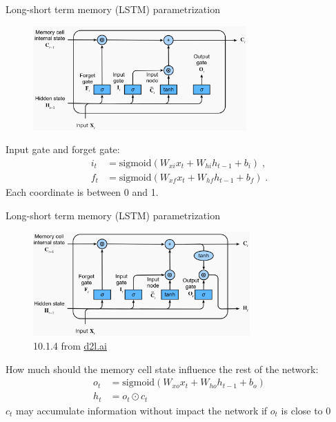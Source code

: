 \documentclass[usenames,dvipsnames,notes,11pt,aspectratio=169,hyperref={colorlinks=true, linkcolor=blue}]{beamer}
\begin{document}
\begin{frame}
    {Long-short term memory (LSTM) parametrization}
    \begin{figure}
        \includegraphics[height=4cm]{figures/lstm-2}
    \end{figure}

    Input gate and forget gate:
            \begin{align*}
 i_t &= \text{sigmoid}(W_{xi}x_t + W_{hi}h_{t-1} + b_i) \;,\\
 f_t &= \text{sigmoid}(W_{xf}x_t + W_{hf}h_{t-1} + b_f) \;.
            \end{align*}
    Each coordinate is between 0 and 1.
\end{frame}

\begin{frame}
    {Long-short term memory (LSTM) parametrization}
    \begin{figure}
        \includegraphics[height=4cm]{figures/lstm-3}
        \caption{10.1.4 from \href{https://d2l.ai/chapter_recurrent-modern/lstm.html}{d2l.ai}}
    \end{figure}
    How much should the memory cell state influence the rest of the network:
            \begin{align*}
 o_t &= \text{sigmoid}(W_{xo}x_t + W_{ho}h_{t-1} + b_o) \\
 h_t &= o_t \odot c_t 
            \end{align*}
    $c_t$ may accumulate information without impact the network if $o_t$ is close to 0
\end{frame}
\end{document}
